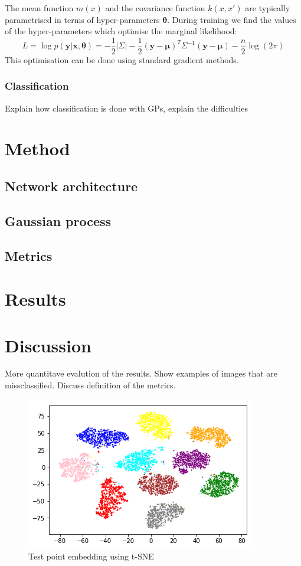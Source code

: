 \documentclass{article}
\begin{document}
The mean function $m(x)$ and the covariance function $k(x,x')$ are typically parametrised in terms of hyper-parameters $\bm{\theta}$. During training we find the values of the hyper-parameters which optimise the marginal likelihood:
\begin{equation*}
	L = \log p(\bm{y}\vert\bm{x},\bm{\theta}) = -\frac{1}{2}\vert\Sigma\vert - \frac{1}{2}(\bm{y}-\bm{\mu})^T\Sigma^{-1}(\bm{y}-\bm{\mu}) - \frac{n}{2}\log(2\pi)
\end{equation*}
This optimisation can be done using standard gradient methods.
\subsubsection{Classification}
Explain how classification is done with GPs, explain the difficulties

\section{Method}
\subsection{Network architecture}
\subsection{Gaussian process}
\subsection{Metrics}

\section{Results}

\section{Discussion}
More quantitave evalution of the results.
Show examples of images that are missclassified.
Discuss definition of the metrics.
\begin{figure}[h]
	\centering
	\includegraphics{embeddings_visualisation.png}
	\caption{Test point embedding using t-SNE}
\end{figure}

\small



\end{document}
